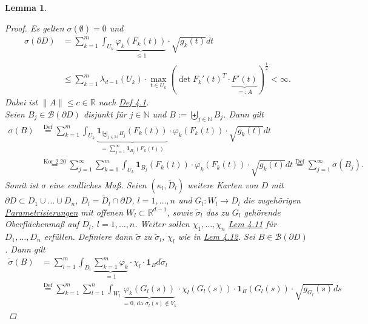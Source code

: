 \documentclass[a4paper]{scrreprt}
\newcommand{\doubleOne}{\textbf{1}}
\newcommand{\R}{\mathbb{R}}
\newcommand{\N}{\mathbb{N}}
\newcommand{\Borel}{\mathcal{B}}
\newcommand{\bigdcup}{\biguplus}
\newcommand{\jshortlink}[1]{\jhyperref{#1}{\text{#1}}}
\newcommand{\jhyperref}[2]{\hyperref[j_#1]{#2}}
\newcommand{\jlink}[1]{\jhyperref{#1}{#1}}
\newcommand{\jabb}[3]{ #1: #2 \rightarrow #3 }
\theoremstyle{plain}
\newtheorem{lem}[thm]{Lemma}
\theoremstyle{definition}
\begin{document}
{{{{\begin{lem}
    \begin{proof}
        Es gelten $\sigma(\emptyset)=0$ und
        \[
            \begin{split}
                \sigma(\partial D) &= \sum_{k=1}^m \int_{U_k} \underbrace{\varphi_k(F_k(t))}_{\le 1} \cdot \sqrt{g_k(t)}dt \\
                                   &\le \sum_{k=1}^m \lambda_{d-1}(U_k)\cdot \max_{t\in U_k}(\det F_k'(t)^T \cdot \underbrace{F'(t)}_{=:A})^\frac{1}{2}
                                   < \infty.
            \end{split}
        \]
        Dabei ist $\lVert A \rVert \le c \in \R$ nach \jlink{Def 4.1}.\\
        Seien $B_j\in \Borel(\partial D)$ disjunkt für $j\in\N$ und $B:= \bigdcup_{j\in\N} B_j$. Dann gilt
        \[
            \begin{split}
                \sigma(B) &\overset{\text{Def}}{=} \sum_{k=1}^m \int_{U_k} \underbrace{\doubleOne_{\bigdcup_{j\in\N} B_j} (F_k(t))}_{=\sum_{j=1}^\infty\doubleOne_{B_j}(F_k(t))} \cdot \varphi_k(F_k(t)) \cdot \sqrt{g_k(t)} dt\\
                          &\overset{\jshortlink{Kor 2.20}}{=} \sum_{j=1}^\infty \sum_{k=1}^m \int_{U_k} \doubleOne_{B_j} (F_k(t))\cdot \varphi_k(F_k(t))\cdot \sqrt{g_k(t)} dt \overset{\text{Def}}{=} \sum_{j=1}^\infty \sigma(B_j).
            \end{split}
        \]
        Somit ist $\sigma$ eine endliches Maß. Seien $(\kappa_l, \tilde{D}_l)$ weitere Karten von $D$ mit $\partial D \subset D_1\cup \dots \cup D_n$, $D_l = \tilde{D}_l\cap \partial D$, $l=1,\dots,n$ und $\jabb{G_l}{W_l}{D_l}$ die zugehörigen \jhyperref{Parametrisierung}{Parametrisierungen} mit offenen $W_l \subset \R^{d-1}$, sowie $\tilde{\sigma}_l$ das zu $G_l$ gehörende Oberflächenmaß auf $D_l$, $l=1,\dots,n$. Weiter sollen $\chi_1,\dots,\chi_n$ \jlink{Lem 4.11} für $D_1, \dots, D_n$ erfüllen. Definiere dann $\tilde{\sigma}$ zu $\tilde{\sigma}_l$, $\chi_l$ wie in \jlink{Lem 4.12}. Sei $B\in \Borel(\partial D)$. Dann gilt
        \[
            \tag{$*$}
            \begin{split}
                \tilde{\sigma}(B) &= \sum_{l=1}^m \int_{D_l} \underbrace{\sum_{k=1}^m \varphi_k}_{=1} \cdot \chi_l \cdot \doubleOne_B d\tilde{\sigma}_l\\
                &\overset{\text{Def}}{=} \sum_{k=1}^m \sum_{l=1}^n \int_{W_l} \underbrace{\varphi_k(G_l(s))}_{=0\text{, da }\sigma_l(s)\notin V_k} \cdot \chi_l(G_l(s)) \cdot \doubleOne_B(G_l(s)) \cdot \sqrt{g_{G_l}(s)} ds

\end{split}\]
\end{proof}
\end{lem}}}}}
\end{document}
